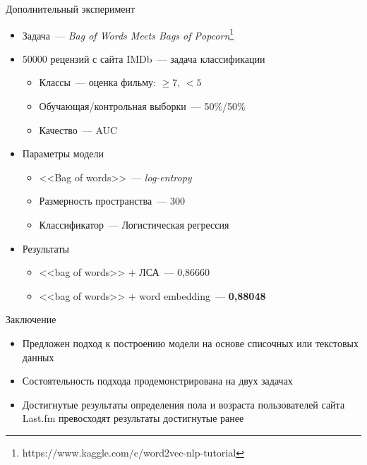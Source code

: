 \documentclass{beamer}
\begin{document}
\begin{frame}{Дополнительный эксперимент}
    \begin{itemize}
        \item {Задача~--- \textit{Bag of Words Meets Bags of Popcorn}\footnote{https://www.kaggle.com/c/word2vec-nlp-tutorial}}
        \item {50000 рецензий с сайта IMDb~--- задача классификации}
            \begin{itemize}
                \item {Классы~--- оценка фильму: $\ge 7$, $< 5$}
                \item {Обучающая/контрольная выборки~--- 50\%/50\%}
                \item {Качество~--- AUC}
            \end{itemize}
        \item {Параметры модели}
            \begin{itemize}
                \item {<<Bag of words>>~--- \textit{log-entropy}}
                \item {Размерность пространства~--- 300} 
                \item {Классификатор~--- Логистическая регрессия}
            \end{itemize}
        \item {Результаты}
            \begin{itemize}
                \item {<<bag of words>> + ЛСА~--- 0{,}86660}
                \item {<<bag of words>> + word embedding~--- \textbf{0{,}88048}}
            \end{itemize}
    \end{itemize}
\end{frame}

\begin{frame}{Заключение}
    \begin{itemize}
        \item {Предложен подход к построению модели на основе
               списочных или текстовых данных}
        \item {Состоятельность подхода продемонстрирована на двух задачах}
        \item {Достигнутые результаты определения пола и возраста
               пользователей сайта Last.fm превосходят результаты
               достигнутые ранее}
    \end{itemize}
\end{frame}
\end{document}
